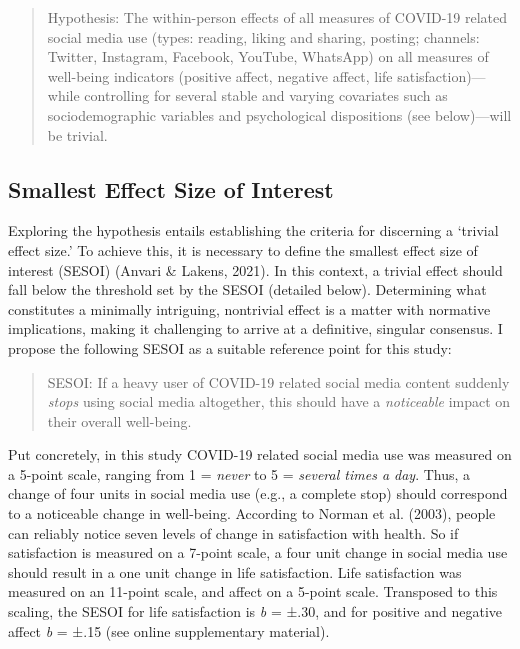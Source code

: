 \documentclass[
  man,mask,floatsintext]{apa7}
\begin{document}
\begin{quote}
Hypothesis: The within-person effects of all measures of COVID-19 related social media use (types: reading, liking and sharing, posting; channels: Twitter, Instagram, Facebook, YouTube, WhatsApp) on all measures of well-being indicators (positive affect, negative affect, life satisfaction)---while controlling for several stable and varying covariates such as sociodemographic variables and psychological dispositions (see below)---will be trivial.
\end{quote}

\subsection{Smallest Effect Size of Interest}\label{smallest-effect-size-of-interest}

Exploring the hypothesis entails establishing the criteria for discerning a `trivial effect size.'
To achieve this, it is necessary to define the smallest effect size of interest (SESOI) (Anvari \& Lakens, 2021).
In this context, a trivial effect should fall below the threshold set by the SESOI (detailed below).
Determining what constitutes a minimally intriguing, nontrivial effect is a matter with normative implications, making it challenging to arrive at a definitive, singular consensus.
I propose the following SESOI as a suitable reference point for this study:

\begin{quote}
SESOI: If a heavy user of COVID-19 related social media content suddenly \emph{stops} using social media altogether, this should have a \emph{noticeable} impact on their overall well-being.
\end{quote}

Put concretely, in this study COVID-19 related social media use was measured on a 5-point scale, ranging from 1 = \emph{never} to 5 = \emph{several times a day}. Thus, a change of four units in social media use (e.g., a complete stop) should correspond to a noticeable change in well-being.
According to Norman et al. (2003), people can reliably notice seven levels of change in satisfaction with health.
So if satisfaction is measured on a 7-point scale, a four unit change in social media use should result in a one unit change in life satisfaction.
Life satisfaction was measured on an 11-point scale, and affect on a 5-point scale.
Transposed to this scaling, the SESOI for life satisfaction is \emph{b} = ±.30, and for positive and negative affect \emph{b} = ±.15 (see online supplementary material).
\end{document}
